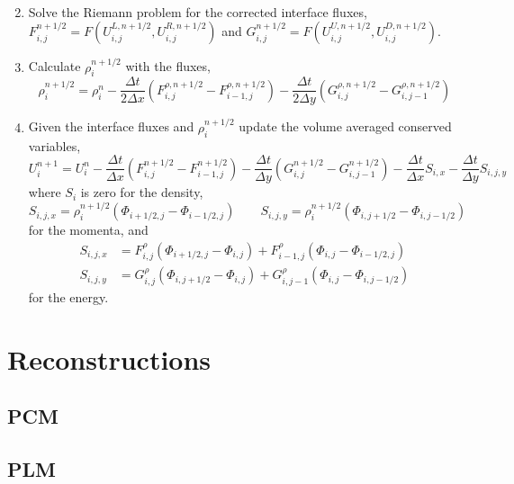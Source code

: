 \documentclass{article}
\begin{document}
\begin{enumerate}
\begin{align}
	\end{align}
	\item Solve the Riemann problem for the corrected interface fluxes, $F_{i,j}^{n+1/2} = F(U_{i,j}^{L,n+1/2}, U_{i,j}^{R,n+1/2})$ and $G_{i,j}^{n+1/2} = F(U_{i,j}^{U,n+1/2},U_{i,j}^{D,n+1/2})$. 
	\item Calculate $\rho_i^{n+1/2}$ with the fluxes,
	\begin{equation}
		\rho_i^{n+1/2} = \rho_i^n - \frac{\Delta t}{2 \Delta x} \left(F_{i,j}^{\rho,n+1/2} - F_{i-1,j}^{\rho,n+1/2} \right)  - \frac{\Delta t}{2 \Delta y} \left(G_{i,j}^{\rho,n+1/2} - G_{i,j-1}^{\rho,n+1/2} \right) 
	\end{equation}

	\item Given the interface fluxes and $\rho_i^{n+1/2}$ update the volume averaged conserved variables, 
	\begin{equation}
		U_i^{n+1} = U_i^n - \frac{\Delta t}{\Delta x} \left(F_{i,j}^{n+1/2} - F_{i-1,j}^{n+1/2} \right) - \frac{\Delta t}{\Delta y} \left(G_{i,j}^{n+1/2} - G_{i,j-1}^{n+1/2} \right) - \frac{\Delta t}{\Delta x} S_{i,x} - \frac{\Delta t}{\Delta y} S_{i,j,y}
	\end{equation}
	where $S_i$ is zero for the density, 
	\begin{equation}
		S_{i,j,x} = \rho_i^{n+1/2} \left( \Phi_{i+1/2,j}-\Phi_{i-1/2,j} \right) \qquad S_{i,j,y} = \rho_i^{n+1/2} \left( \Phi_{i,j+1/2}-\Phi_{i,j-1/2} \right)
	\end{equation}
	for the momenta, and
	\begin{align}
		S_{i,j,x} &= F_{i,j}^\rho \left(\Phi_{i+1/2,j}-\Phi_{i,j}\right) + F_{i-1,j}^\rho \left(\Phi_{i,j}-\Phi_{i-1/2,j}\right) \\
		S_{i,j,y} &= G_{i,j}^\rho \left(\Phi_{i,j+1/2}-\Phi_{i,j}\right) + G_{i,j-1}^\rho \left(\Phi_{i,j}-\Phi_{i,j-1/2}\right)
	\end{align}
	for the energy.

\end{enumerate}

\section{Reconstructions}
\subsection{PCM}
\subsection{PLM}
\end{document}
